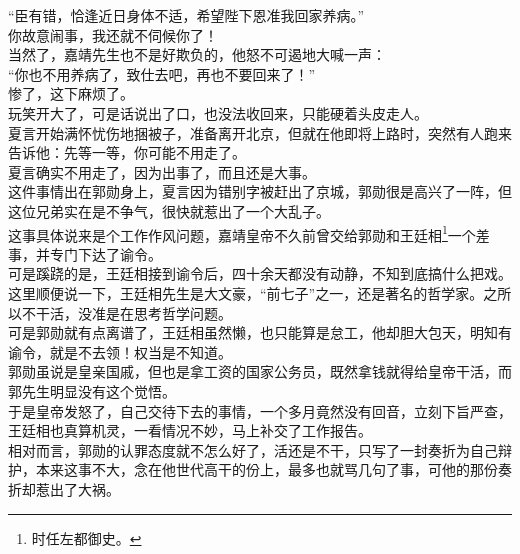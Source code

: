 \begin{multicols}{\theparacolNo}
“臣有错，恰逢近日身体不适，希望陛下恩准我回家养病。”\\

你故意闹事，我还就不伺候你了！\\

当然了，嘉靖先生也不是好欺负的，他怒不可遏地大喊一声：\\

“你也不用养病了，致仕去吧，再也不要回来了！”\\

惨了，这下麻烦了。\\

玩笑开大了，可是话说出了口，也没法收回来，只能硬着头皮走人。\\

夏言开始满怀忧伤地捆被子，准备离开北京，但就在他即将上路时，突然有人跑来告诉他：先等一等，你可能不用走了。\\

夏言确实不用走了，因为出事了，而且还是大事。\\

这件事情出在郭勋身上，夏言因为错别字被赶出了京城，郭勋很是高兴了一阵，但这位兄弟实在是不争气，很快就惹出了一个大乱子。\\

这事具体说来是个工作作风问题，嘉靖皇帝不久前曾交给郭勋和王廷相\footnote{时任左都御史。}一个差事，并专门下达了谕令。\\

可是蹊跷的是，王廷相接到谕令后，四十余天都没有动静，不知到底搞什么把戏。\\

这里顺便说一下，王廷相先生是大文豪，“前七子”之一，还是著名的哲学家。之所以不干活，没准是在思考哲学问题。\\

可是郭勋就有点离谱了，王廷相虽然懒，也只能算是怠工，他却胆大包天，明知有谕令，就是不去领！权当是不知道。\\

郭勋虽说是皇亲国戚，但也是拿工资的国家公务员，既然拿钱就得给皇帝干活，而郭先生明显没有这个觉悟。\\

于是皇帝发怒了，自己交待下去的事情，一个多月竟然没有回音，立刻下旨严查，王廷相也真算机灵，一看情况不妙，马上补交了工作报告。\\

相对而言，郭勋的认罪态度就不怎么好了，活还是不干，只写了一封奏折为自己辩护，本来这事不大，念在他世代高干的份上，最多也就骂几句了事，可他的那份奏折却惹出了大祸。\\


\end{multicols}
